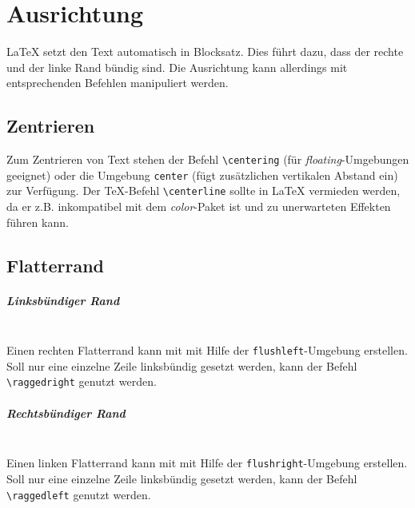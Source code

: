 \chapter{Ausrichtung}
\LaTeX{} setzt den Text automatisch in Blocksatz. Dies führt dazu, dass der rechte und der linke Rand bündig sind. Die Ausrichtung kann allerdings mit entsprechenden Befehlen manipuliert werden.


\section{Zentrieren}
Zum Zentrieren von Text stehen der Befehl \verb=\centering= (für \textit{floating}-Umgebungen geeignet) oder die Umgebung \verb=center= (fügt zusätzlichen vertikalen Abstand ein) zur Verfügung. Der \TeX-Befehl \verb=\centerline= sollte in \LaTeX{} vermieden werden, da er z.B. inkompatibel mit dem \textsl{color}-Paket ist und zu unerwarteten Effekten führen kann.


\section{Flatterrand}

\paragraph{Linksbündiger Rand}\leavevmode\\
Einen rechten Flatterrand kann mit mit Hilfe der \verb=flushleft=-Umgebung erstellen. Soll nur eine einzelne Zeile linksbündig gesetzt werden, kann der Befehl \verb=\raggedright= genutzt werden.

\paragraph{Rechtsbündiger Rand}\leavevmode\\
Einen linken Flatterrand kann mit mit Hilfe der \verb=flushright=-Umgebung erstellen. Soll nur eine einzelne Zeile linksbündig gesetzt werden, kann der Befehl \verb=\raggedleft= genutzt werden.
